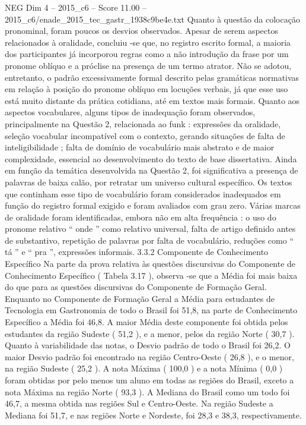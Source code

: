 \begin{textsample}{NEG Dim 4 – 2015\_c6 – Score 11.00 – 2015\_c6/enade\_2015\_tec\_gastr\_1938c9be4e.txt}
Quanto à questão da colocação pronominal, foram poucos os desvios observados.
Apesar de serem aspectos relacionados à oralidade, concluiu -se que, no registro escrito formal, a maioria dos participantes já incorporou regras como a não introdução da frase por um pronome oblíquo e a próclise na presença de um termo atrator.
Não se adotou, entretanto, o padrão excessivamente formal descrito pelas gramáticas normativas em relação à posição do pronome oblíquo em locuções verbais, já que esse uso está muito distante da prática cotidiana, até em textos mais formais.
Quanto aos aspectos vocabulares, alguns tipos de inadequação foram observados, principalmente na Questão 2, relacionada ao funk : expressões da oralidade, seleção vocabular incompatível com o contexto, gerando situações de falta de inteligibilidade ; falta de domínio de vocabulário mais abstrato e de maior complexidade, essencial ao desenvolvimento do texto de base dissertativa.
Ainda em função da temática desenvolvida na Questão 2, foi significativa a presença de palavras de baixa calão, por retratar um universo cultural específico.
Os textos que continham esse tipo de vocabulário foram considerados inadequados em função do registro formal exigido e foram avaliados com grau zero.
Várias marcas de oralidade foram identificadas, embora não em alta frequência : o uso do pronome relativo “ onde ” como relativo universal, falta de artigo definido antes de substantivo, repetição de palavras por falta de vocabulário, reduções como “ tá ” e “ pra ”, expressões informais. 3.3.2 Componente de Conhecimento Específico Na parte da prova relativa às questões discursivas do Componente de Conhecimento Específico ( Tabela 3.17 ), observa -se que a Média foi mais baixa do que para as questões discursivas do Componente de Formação Geral.
Enquanto no Componente de Formação Geral a Média para estudantes de Tecnologia em Gastronomia de todo o Brasil foi 51,8, na parte de Conhecimento Específico a Média foi 46,8.
A maior Média deste componente foi obtida pelos estudantes da região Sudeste ( 51,2 ), e a menor, pelos da região Norte ( 30,7 ).
Quanto à variabilidade das notas, o Desvio padrão de todo o Brasil foi 26,2.
O maior Desvio padrão foi encontrado na região Centro-Oeste ( 26,8 ), e o menor, na região Sudeste ( 25,2 ).
A nota Máxima ( 100,0 ) e a nota Mínima ( 0,0 ) foram obtidas por pelo menos um aluno em todas as regiões do Brasil, exceto a nota Máxima na região Norte ( 93,3 ).
A Mediana do Brasil como um todo foi 46,7, a mesma obtida nas regiões Sul e Centro-Oeste.
Na região Sudeste a Mediana foi 51,7, e nas regiões Norte e Nordeste, foi 28,3 e 38,3, respectivamente.

\end{textsample}
